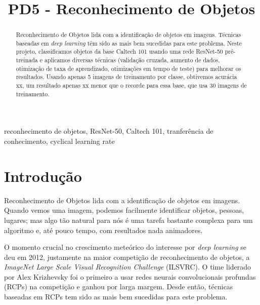 \documentclass[conference]{IEEEtran}
\begin{document}
\title{PD5 - Reconhecimento de Objetos}

\author{
}

\maketitle

\begin{abstract}
Reconhecimento de Objetos lida com a identificação de objetos em imagens. Técnicas baseadas em \textit{deep learning} têm sido as mais bem sucedidas para este problema. Neste projeto, classificamos objetos da base Caltech 101\cite{caltech101} usando uma rede ResNet-50 pré-treinada e aplicamos diversas técnicas (validação cruzada, aumento de dados, otimização de taxa de aprendizado, otimizações em tempo de teste) para melhorar os resultados. Usando apenas 5 imagens de treinamento por classe, obtivemos acurácia xx, um resultado apenas xx menor que o recorde para essa base, que usa 30 imagens de treinamento. 
\end{abstract}

\begin{IEEEkeywords}
reconhecimento de objetos, ResNet-50, Caltech 101, tranferência de conhecimento, cyclical learning rate
\end{IEEEkeywords}

\section{Introdução}

Reconhecimento de Objetos lida com a identificação de objetos em imagens. Quando vemos uma imagem, podemos facilmente identificar objetos, pessoas, lugares; mas algo tão natural para nós é uma tarefa bastante complexa para um algoritmo e, até pouco tempo, com resultados nada animadores.

O momento crucial no crescimento meteórico do interesse por \textit{deep learning} se deu em 2012, justamente na maior competição de reconhecimento de objetos, a  \textit{ImageNet Large Scale Visual Recognition Challenge}  (ILSVRC)\cite{goodfellow}. O time liderado por Alex Krizhevsky foi o primeiro a usar redes neurais convolucionais profundas (RCPs) na competição e ganhou por larga margem\cite{alexnet}. Desde então, técnicas baseadas em RCPs tem sido as mais bem sucedidas para este problema.
\end{document}
